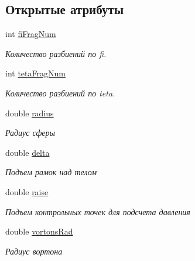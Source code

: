 \subsection*{Открытые атрибуты}
\begin{DoxyCompactItemize}
\item 
\mbox{\label{struct_sphere_parameters_a4272f5d9878591e54effa8b08fc98043}} 
int \mbox{\hyperlink{struct_sphere_parameters_a4272f5d9878591e54effa8b08fc98043}{fi\+Frag\+Num}}
\begin{DoxyCompactList}\small\item\em Количество разбиений по fi. \end{DoxyCompactList}\item 
\mbox{\label{struct_sphere_parameters_a86a882fb87882d37cc8cb2b50dcbe6bc}} 
int \mbox{\hyperlink{struct_sphere_parameters_a86a882fb87882d37cc8cb2b50dcbe6bc}{teta\+Frag\+Num}}
\begin{DoxyCompactList}\small\item\em Количество разбиений по teta. \end{DoxyCompactList}\item 
\mbox{\label{struct_sphere_parameters_a293c740a7e310a36a56eb825970dac82}} 
double \mbox{\hyperlink{struct_sphere_parameters_a293c740a7e310a36a56eb825970dac82}{radius}}
\begin{DoxyCompactList}\small\item\em Радиус сферы \end{DoxyCompactList}\item 
\mbox{\label{struct_sphere_parameters_a0e2d5b55ff372125d08e95c2b01678f1}} 
double \mbox{\hyperlink{struct_sphere_parameters_a0e2d5b55ff372125d08e95c2b01678f1}{delta}}
\begin{DoxyCompactList}\small\item\em Подъем рамок над телом \end{DoxyCompactList}\item 
\mbox{\label{struct_sphere_parameters_a19b6d3a05903b4f898f123d37f4acc87}} 
double \mbox{\hyperlink{struct_sphere_parameters_a19b6d3a05903b4f898f123d37f4acc87}{raise}}
\begin{DoxyCompactList}\small\item\em Подъем контрольных точек для подсчета давления \end{DoxyCompactList}\item 
\mbox{\label{struct_sphere_parameters_a50e53f1c981b58475cd63e01af4f25d8}} 
double \mbox{\hyperlink{struct_sphere_parameters_a50e53f1c981b58475cd63e01af4f25d8}{vortons\+Rad}}
\begin{DoxyCompactList}\small\item\em Радиус вортона \end{DoxyCompactList}\end{DoxyCompactItemize}


